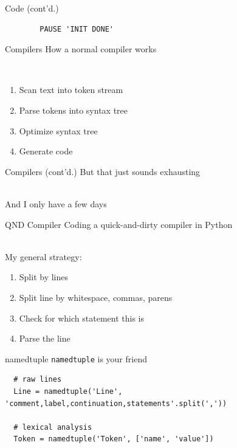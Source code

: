 \documentclass{beamer}
\def\py{
  \lstset{
     language=Python,
     extendedchars=true,
     basicstyle=\footnotesize\ttfamily,
     showstringspaces=false,
     showspaces=false,
     numbersep=9pt,
     tabsize=2,
     breaklines=true,
     showtabs=false,
     captionpos=b
  }
}
\def\fortran{
  \lstset{
     language=[77]FORTRAN,
     keywordstyle=\bfseries,
     extendedchars=true,
     basicstyle=\footnotesize\ttfamily,
     showstringspaces=false,
     showspaces=false,
     numbersep=9pt,
     tabsize=8,
     breaklines=true,
     showtabs=false,
     captionpos=b
  }
}
\begin{document}
\begin{frame}[fragile]{Code (cont'd.)}
\fortran
\begin{lstlisting}
        PAUSE 'INIT DONE'
\end{lstlisting}
\end{frame}
\begin{frame}{Compilers}
How a normal compiler works

\ \\

  \begin{enumerate}
    \item Scan text into token stream
    \item Parse tokens into syntax tree
    \item Optimize syntax tree
    \item Generate code
  \end{enumerate}
\end{frame}
\begin{frame}{Compilers (cont'd.)}
But that just sounds exhausting

\ \\

And I only have a few days
\end{frame}
\begin{frame}{QND Compiler}
Coding a quick-and-dirty compiler in Python

\ \\

My general strategy:

\begin{enumerate}
\item Split by lines
\item Split line by whitespace, commas, parens
\item Check for which statement this is
\item Parse the line
\end{enumerate}
\end{frame}
\begin{frame}[fragile]{namedtuple}
\texttt{namedtuple} is your friend

\py
\begin{lstlisting}
  # raw lines
  Line = namedtuple('Line', 'comment,label,continuation,statements'.split(','))

  # lexical analysis
  Token = namedtuple('Token', ['name', 'value'])
\end{lstlisting}
\end{frame}
\end{document}
